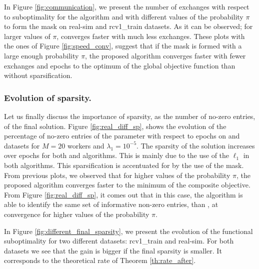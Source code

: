 In Figure \ref{fig:communication}, we present the number of exchanges with respect to suboptimality for the \dave{} algorithm \cite{ICML18} and \SP{} with different values of the probability $\pi$ to form the mask on real-sim and rcv1\_train datasets. As it can be observed; for larger values of $\pi$, \SP{} converges faster  with much less exchanges. These plots with the ones of Figure \ref{fig:speed_conv}, suggest that if the mask is formed with a large enough probability $\pi$, the proposed algorithm converges faster with fewer exchanges and epochs to the optimum of the global objective function than without sparsification.


\subsubsection{Evolution of sparsity.}

Let us finally discuss the importance of sparsity, as the number of no-zero entries, of the final solution. Figure \ref{fig:real_diff_sp}, shows the evolution of the percentage of no-zero entries of the parameter with respect to epochs on  and  datasets for $M=20$ workers and $\lambda_1=10^{-5}$. The sparsity of the solution increases over epochs for both \dave{} and \SP{} algorithms. This is mainly due to the use of the $\ell_1$ in both algorithms. This sparsification is accentuated for \SP{} by the use of the mask. From previous plots, we observed that for higher values of the probability $\pi$, the proposed algorithm converges faster to the minimum of the composite objective. From Figure \ref{fig:real_diff_sp}, it comes out that in this case, the \SP{} algorithm is able to identify the same set of informative non-zero entries, than \dave{}, at convergence for higher values of the probability $\pi$.

In Figure \ref{fig:different_final_sparsity}, we present the evolution of the functional suboptimality for two different datasets: rcv1\_train and real-sim. For both datasets we see that the gain is bigger if the final sparsity is smaller. It corresponds to the theoretical rate of Theorem \ref{th:rate_after}.

